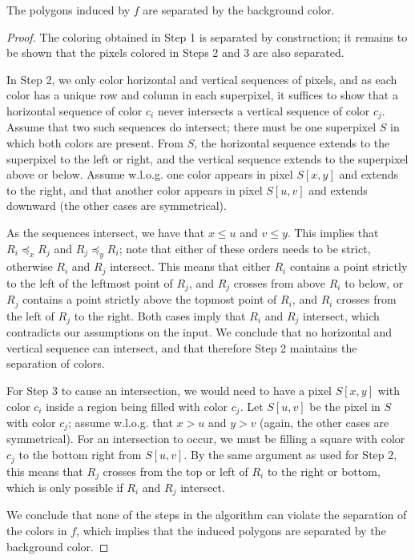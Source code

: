 \documentclass[a4paper,UKenglish,cleveref]{lipics-v2019}
\begin{document}
\begin{lemma}\label{lem:convex-separated}
	The polygons induced by \(f\) are separated by the background color.
\end{lemma}
\begin{proof}
	The coloring obtained in Step 1 is separated by construction; it remains to be shown that the pixels colored in Steps 2 and 3 are also separated.

	In Step 2, we only color horizontal and vertical sequences of pixels, and as each color has a unique row and column in each superpixel, it suffices to show that a horizontal sequence of color \(c_i\) never intersects a vertical sequence of color \(c_j\). Assume that two such sequences do intersect; there must be one superpixel \(S\) in which both colors are present. From \(S\), the horizontal sequence extends to the superpixel to the left or right, and the vertical sequence extends to the superpixel above or below. Assume w.l.o.g. one color appears in pixel \(S[x,y]\) and extends to the right, and that another color appears in pixel \(S[u,v]\) and extends downward (the other cases are symmetrical).

	As the sequences intersect, we have that \(x \leq u\) and \(v \leq y\). This implies that \(R_i \preceq_x R_j\) and \(R_j \preceq_y R_i\); note that either of these orders needs to be strict, otherwise \(R_i\) and \(R_j\) intersect. This means that either \(R_i\) contains a point strictly to the left of the leftmost point of \(R_j\), and \(R_j\) crosses from above \(R_i\) to below, or \(R_j\) contains a point strictly above the topmost point of \(R_i\), and \(R_i\) crosses from the left of \(R_j\) to the right. Both cases imply that \(R_i\) and \(R_j\) intersect, which contradicts our assumptions on the input. We conclude that no horizontal and vertical sequence can intersect, and that therefore Step 2 maintains the separation of colors.

	For Step 3 to cause an intersection, we would need to have a pixel \(S[x,y]\) with color \(c_i\) inside a region being filled with color \(c_j\). Let \(S[u,v]\) be the pixel in \(S\) with color \(c_j\); assume w.l.o.g. that \(x > u\) and \(y > v\) (again, the other cases are symmetrical). For an intersection to occur, we must be filling a square with color \(c_j\) to the bottom right from \(S[u,v]\). By the same argument as used for Step 2, this means that \(R_j\) crosses from the top or left of \(R_i\) to the right or bottom, which is only possible if \(R_i\) and \(R_j\) intersect.

	We conclude that none of the steps in the algorithm can violate the separation of the colors in \(f\), which implies that the induced polygons are separated by the background color.
\end{proof}
\end{document}
